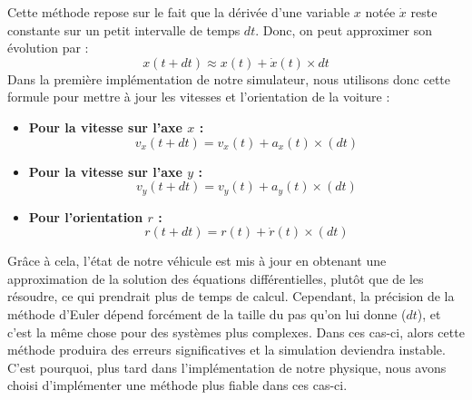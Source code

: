 \documentclass[a4paper,12pt]{report}
\begin{document}
    Cette méthode repose sur le fait que la dérivée d'une variable $x$ notée $\dot{x}$ reste constante sur un petit intervalle de temps $dt$. Donc, on peut approximer son évolution par :
    $$x(t+dt) \approx x(t) + \dot{x}(t) \times dt$$
    Dans la première implémentation de notre simulateur, nous utilisons donc cette formule pour mettre à jour les vitesses et l'orientation de la voiture :
    \\
    \begin{itemize}
        \item \textbf{Pour la vitesse sur l'axe $x$ :}
        $$v_x(t+dt) = v_x(t)+a_x(t)\times(dt)$$
        \item \textbf{Pour la vitesse sur l'axe $y$ :}
        $$v_y(t+dt) = v_y(t)+a_y(t)\times(dt)$$
        \item \textbf{Pour l'orientation $r$ :}
        $$r(t+dt) = r(t)+\dot{r}(t)\times(dt)$$
    \end{itemize}
    Grâce à cela, l'état de notre véhicule est mis à jour en obtenant une approximation de la solution des équations différentielles, plutôt que de les résoudre, ce qui prendrait plus de temps de calcul.
    Cependant, la précision de la méthode d'Euler dépend forcément de la taille du pas qu'on lui donne ($dt$), et c'est la même chose pour des systèmes plus complexes. Dans ces cas-ci, alors cette méthode produira des erreurs significatives et la simulation deviendra instable. C'est pourquoi, plus tard dans l'implémentation de notre physique, nous avons choisi d'implémenter une méthode plus fiable dans ces cas-ci.
\end{document}
